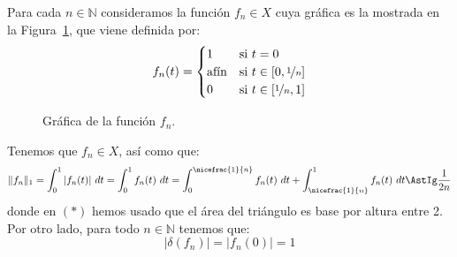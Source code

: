 \documentclass[12pt]{article}
\begin{document}
\begin{ejercicio}[2 puntos]
\begin{enumerate}[label=\alph*)]
\begin{description}
                    Para cada $n\in \mathbb{N}$ consideramos la función $f_n\in X$ cuya gráfica es la mostrada en la Figura~\ref{fig:funcion2}, que viene definida por:
                    \begin{equation*}
                        f_n(t) = \begin{cases}
                            1 & \text{si\ } t=0 \\
                            \text{afín} & \text{si\ } t\in [0,\nicefrac{1}{n}] \\
                            0 & \text{si\ } t\in [\nicefrac{1}{n},1] \\
                        \end{cases}
                    \end{equation*}
                    \begin{figure}[h]
                        \centering
                        \caption{Gráfica de la función $f_n$.}
                        \label{fig:funcion2}
                    \end{figure}

                    Tenemos que $f_n\in X$, así como que:
                    \begin{equation*}
                        \|f_n\|_1 = \int_{0}^{1} |f_n(t)|~dt  = \int_{0}^{1} f_n(t)~dt  = \int_{0}^{\nicefrac{1}{n}}f_n(t) ~dt  + \int_{\nicefrac{1}{n}}^{1} f_n(t)~dt  \AstIg \frac{1}{2n}
                    \end{equation*}
                    donde en $(\ast)$ hemos usado que el área del triángulo es base por altura entre 2. Por otro lado, para todo $n\in \mathbb{N}$ tenemos que:
                    \begin{equation*}
                        |\delta(f_n)| = |f_n(0)| = 1
                    \end{equation*}


\end{description}
\end{enumerate}
\end{ejercicio}
\end{document}
